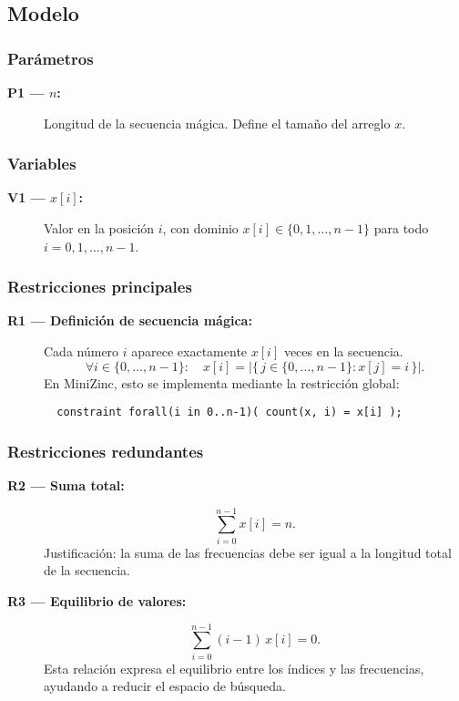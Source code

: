 

\subsection{Modelo}\label{sec:01-secuencias-magicas-modelo}

\subsubsection*{Parámetros}
\begin{description}
  \item[\textbf{P1 — \(n\):}] Longitud de la secuencia mágica. Define el tamaño del arreglo \(x\).
\end{description}

\subsubsection*{Variables}
\begin{description}
  \item[\textbf{V1 — \(x[i]\):}] Valor en la posición \(i\), con dominio \(x[i] \in \{0, 1, \dots, n-1\}\) para todo \(i = 0, 1, \dots, n-1\).
\end{description}

\subsubsection*{Restricciones principales}
\begin{description}
  \item[\textbf{R1 — Definición de secuencia mágica:}] Cada número \(i\) aparece exactamente \(x[i]\) veces en la secuencia. 
  \[
  \forall i \in \{0, \dots, n-1\}:\quad x[i] = \bigl|\{\, j \in \{0, \dots, n-1\} : x[j] = i \,\}\bigr|.
  \]
  En MiniZinc, esto se implementa mediante la restricción global:
  \begin{verbatim}
  constraint forall(i in 0..n-1)( count(x, i) = x[i] );
  \end{verbatim}
\end{description}

\subsubsection*{Restricciones redundantes}
\begin{description}
  \item[\textbf{R2 — Suma total:}]
  \[
  \sum_{i=0}^{n-1} x[i] = n.
  \]
  Justificación: la suma de las frecuencias debe ser igual a la longitud total de la secuencia.

  \item[\textbf{R3 — Equilibrio de valores:}]
  \[
  \sum_{i=0}^{n-1} (i-1)\,x[i] = 0.
  \]
  Esta relación expresa el equilibrio entre los índices y las frecuencias, ayudando a reducir el espacio de búsqueda.
\end{description}
